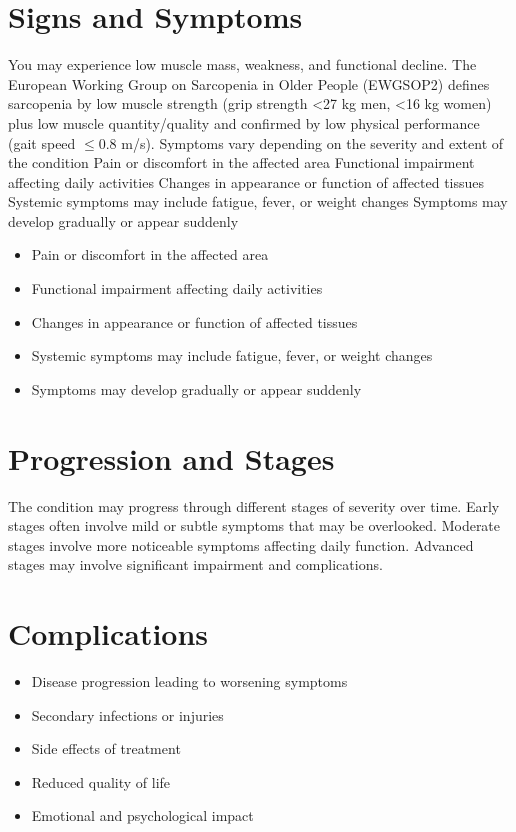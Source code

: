 \section{Signs and Symptoms}
You may experience low muscle mass, weakness, and functional decline. The European Working Group on Sarcopenia in Older People (EWGSOP2) defines sarcopenia by low muscle strength (grip strength <27 kg men, <16 kg women) plus low muscle quantity/quality and confirmed by low physical performance (gait speed $\leq$0.8 m/s). Symptoms vary depending on the severity and extent of the condition Pain or discomfort in the affected area Functional impairment affecting daily activities Changes in appearance or function of affected tissues Systemic symptoms may include fatigue, fever, or weight changes Symptoms may develop gradually or appear suddenly

\begin{itemize}[noitemsep]
  \item Pain or discomfort in the affected area
  \item Functional impairment affecting daily activities
  \item Changes in appearance or function of affected tissues
  \item Systemic symptoms may include fatigue, fever, or weight changes
  \item Symptoms may develop gradually or appear suddenly
\end{itemize}
\section{Progression and Stages}
The condition may progress through different stages of severity over time. Early stages often involve mild or subtle symptoms that may be overlooked. Moderate stages involve more noticeable symptoms affecting daily function. Advanced stages may involve significant impairment and complications.
\section{Complications}
\begin{itemize}[noitemsep]
  \item Disease progression leading to worsening symptoms
  \item Secondary infections or injuries
  \item Side effects of treatment
  \item Reduced quality of life
  \item Emotional and psychological impact
\end{itemize}
